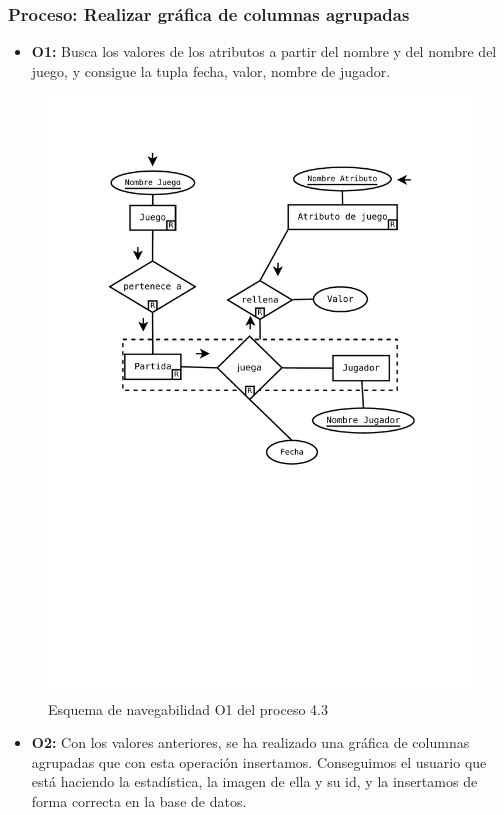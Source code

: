 \subsubsection{Proceso: Realizar gráfica de columnas agrupadas}

\begin{itemize}
	\item \textbf{O1:} Busca los valores de los atributos a partir del nombre y del nombre del juego, y consigue la tupla fecha, valor, nombre de jugador.
\end{itemize}

\begin{figure}[H]
	\centering
	\includegraphics[width=0.5\linewidth]{../Diagramas/pdf/OpEstadisticas3.pdf}
	\caption{Esquema de navegabilidad  O1 del proceso 4.3}
	
	\label{fig:O4.3}
\end{figure}
\begin{itemize}
	\item \textbf{O2:} Con los valores anteriores, se ha realizado una gráfica de columnas agrupadas que con esta operación insertamos. Conseguimos el usuario que está haciendo la estadística, la imagen de ella y su id, y la insertamos de forma correcta en la base de datos.
\end{itemize}

